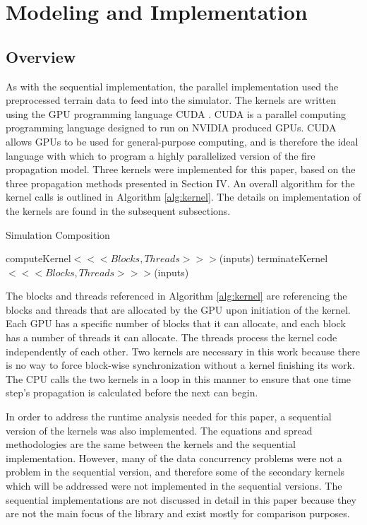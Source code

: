 \chapter{Modeling and Implementation}
\label{chapter:implementation}

\section{Overview}
As with the sequential implementation, the parallel implementation used the preprocessed terrain data to feed into the simulator. The kernels are written using the GPU programming language CUDA \cite{cuda}. CUDA is a parallel computing programming language designed to run on NVIDIA produced GPUs. CUDA allows GPUs to be used for general-purpose computing, and is therefore the ideal language with which to program a highly parallelized version of the fire propagation model. Three kernels were implemented for this paper, based on the three propagation methods presented in Section IV. An overall algorithm for the kernel calls is outlined in Algorithm \ref{alg:kernel}. The details on implementation of the kernels are found in the subsequent subsections.

\begin{algorithm}
  \small
  \caption{Simulation Composition}
  \label{alg:kernel}
  \begin{algorithmic}
  \STATE computeKernel$<<<Blocks,Threads>>>$(inputs)
  \STATE terminateKernel$<<<Blocks,Threads>>>$(inputs)
  \ENDWHILE
  \end{algorithmic}
\end{algorithm}

The blocks and threads referenced in Algorithm \ref{alg:kernel} are referencing the blocks and threads that are allocated by the GPU upon initiation of the kernel. Each GPU has a specific number of blocks that it can allocate, and each block has a number of threads it can allocate. The threads process the kernel code independently of each other. Two kernels are necessary in this work because there is no way to force block-wise synchronization without a kernel finishing its work. The CPU calls the two kernels in a loop in this manner to ensure that one time step's propagation is calculated before the next can begin.

In order to address the runtime analysis needed for this paper, a sequential version of the kernels was also implemented. The equations and spread methodologies are the same between the kernels and the sequential implementation. However, many of the data concurrency problems were not a problem in the sequential version, and therefore some of the secondary kernels which will be addressed were not implemented in the sequential versions. The sequential implementations are not discussed in detail in this paper because they are not the main focus of the library and exist mostly for comparison purposes.  


